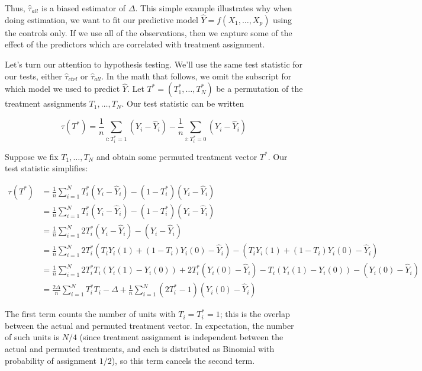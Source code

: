 \documentclass[12pt]{article}
\begin{document}
Thus, $\hat{\tau}_{all}$ is a biased estimator of $\Delta$.  This simple example illustrates why when doing estimation, we want to fit our predictive model $\hat{Y} = f(X_1, \dots, X_p)$ using the controls only.  If we use all of the observations, then we capture some of the effect of the predictors which are correlated with treatment assignment.

Let's turn our attention to hypothesis testing.
We'll use the same test statistic for our tests, either $\hat{\tau}_{ctrl}$ or $\hat{\tau}_{all}$.
In the math that follows, we omit the subscript for which model we used to predict $\hat{Y}$.
Let $T^* = (T_1^*, \dots, T_N^*)$ be a permutation of the treatment assignments $T_1, \dots, T_N$.
Our test statistic can be written

\begin{equation}
\tau(T^*) = \frac{1}{n} \sum_{i: T_i^* =1}(Y_i - \hat{Y}_i) - \frac{1}{n} \sum_{i: T_i^* = 0} (Y_i - \hat{Y}_i)
\end{equation}

Suppose we fix $T_1, \dots, T_N$ and obtain some permuted treatment vector $T^*$.
Our test statistic simplifies:

\begin{align*}
\tau(T^*) &= \frac{1}{n} \sum_{i=1}^N T_i^* (Y_i - \hat{Y}_i) - (1-T_i^*)(Y_i - \hat{Y}_i) \\
&= \frac{1}{n} \sum_{i=1}^N T_i^* (Y_i - \hat{Y}_i) - (1-T_i^*)(Y_i - \hat{Y}_i) \\
&= \frac{1}{n} \sum_{i=1}^N 2T_i^* (Y_i - \hat{Y}_i) - (Y_i - \hat{Y}_i) \\
&= \frac{1}{n} \sum_{i=1}^N 2T_i^* (T_iY_i(1) + (1-T_i)Y_i(0) - \hat{Y}_i) - (T_iY_i(1) + (1-T_i)Y_i(0) - \hat{Y}_i) \\
&= \frac{1}{n} \sum_{i=1}^N 2T_i^*T_i (Y_i(1) - Y_i(0)) + 2T_i^*(Y_i(0) - \hat{Y}_i) - T_i (Y_i(1) - Y_i(0)) - (Y_i(0) - \hat{Y}_i) \\
&= \frac{2\Delta}{n} \sum_{i=1}^N T_i^* T_i - \Delta + \frac{1}{n} \sum_{i=1}^N (2T_i^* - 1)(Y_i(0) - \hat{Y}_i)
\end{align*}

The first term counts the number of units with $T_i = T_i^* = 1$; this is the overlap between the actual and permuted treatment vector.
In expectation, the number of such units is $N/4$ (since treatment assignment is independent between the actual and permuted treatments, and each is distributed as Binomial with probability of assignment $1/2$), so this term cancels the second term.
\end{document}

